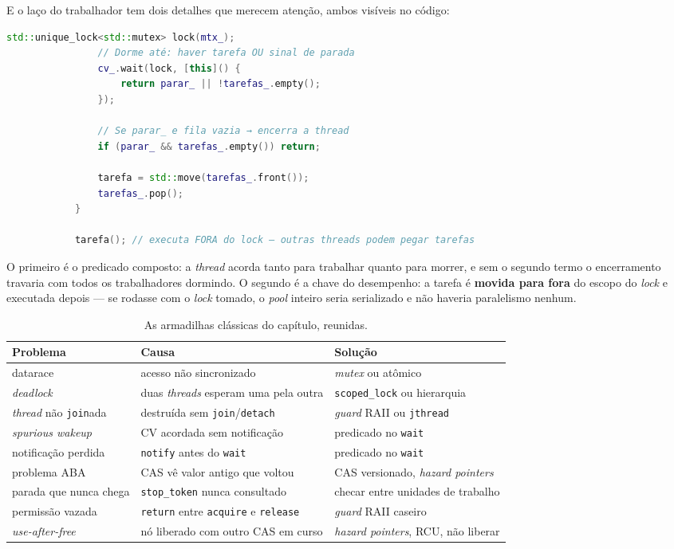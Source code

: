 E o laço do trabalhador tem dois detalhes que merecem atenção, ambos visíveis no
código:

\begin{lstlisting}[style=bt, language=C++,
    caption={O laço do trabalhador, em
             \texttt{src/concurrency/demo\_patterns.hpp}.}]
                std::unique_lock<std::mutex> lock(mtx_);
                // Dorme até: haver tarefa OU sinal de parada
                cv_.wait(lock, [this]() {
                    return parar_ || !tarefas_.empty();
                });

                // Se parar_ e fila vazia → encerra a thread
                if (parar_ && tarefas_.empty()) return;

                tarefa = std::move(tarefas_.front());
                tarefas_.pop();
            }

            tarefa(); // executa FORA do lock — outras threads podem pegar tarefas
\end{lstlisting}

O primeiro é o predicado composto: a \emph{thread} acorda tanto para trabalhar
quanto para morrer, e sem o segundo termo o encerramento travaria com todos os
trabalhadores dormindo. O segundo é a chave do desempenho: a tarefa é
\textbf{movida para fora} do escopo do \emph{lock} e executada depois --- se
rodasse com o \emph{lock} tomado, o \emph{pool} inteiro seria serializado e não
haveria paralelismo nenhum.

\begin{table}[htbp]
\centering
\caption{As armadilhas clássicas do capítulo, reunidas.}
\label{tab:armadilhas-concorrencia}
\footnotesize
\begin{tabular}{@{}lll@{}}
\toprule
\textbf{Problema} & \textbf{Causa} & \textbf{Solução} \\
\midrule
\gls{datarace}        & acesso não sincronizado        & \emph{mutex} ou atômico \\
\emph{deadlock}       & duas \emph{threads} esperam uma pela outra & \texttt{scoped\_lock} ou hierarquia \\
\emph{thread} não \texttt{join}ada & destruída sem \texttt{join}/\texttt{detach} & \emph{guard} RAII ou \texttt{jthread} \\
\emph{spurious wakeup}& CV acordada sem notificação    & predicado no \texttt{wait} \\
notificação perdida   & \texttt{notify} antes do \texttt{wait} & predicado no \texttt{wait} \\
problema ABA          & CAS vê valor antigo que voltou & CAS versionado, \emph{hazard pointers} \\
parada que nunca chega& \texttt{stop\_token} nunca consultado & checar entre unidades de trabalho \\
permissão vazada      & \texttt{return} entre \texttt{acquire} e \texttt{release} & \emph{guard} RAII caseiro \\
\emph{use-after-free} & nó liberado com outro CAS em curso & \emph{hazard pointers}, RCU, não liberar \\
\bottomrule
\end{tabular}
\end{table}

